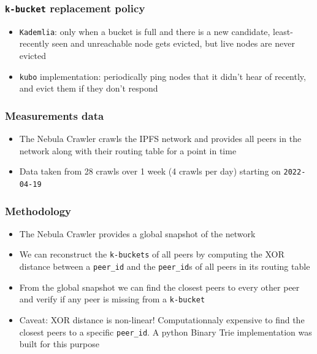 \documentclass{pl-slide}
\begin{document}
\begin{frame}
\frametitle{\texttt{k-bucket} replacement policy}
\begin{itemize}
    \item \texttt{Kademlia}: only when a bucket is full and there is a new candidate, least-recently seen and unreachable node gets evicted, but live nodes are never evicted
	\bigskip    
    \item \texttt{kubo} implementation: periodically ping nodes that it didn't hear of recently, and evict them if they don't respond
\end{itemize}
\end{frame}

\begin{frame}
\frametitle{Measurements data}
\begin{itemize}
    \item The Nebula Crawler crawls the IPFS network and provides all peers in the network along with their routing table for a point in time
    \item Data taken from 28 crawls over 1 week (4 crawls per day) starting on \texttt{2022-04-19}
\end{itemize}
\end{frame}

\begin{frame}
\frametitle{Methodology}
\begin{itemize}
	\item The Nebula Crawler provides a global snapshot of the network
	\item We can reconstruct the \texttt{k-buckets} of all peers by computing the XOR distance between a \texttt{peer\_id} and the \texttt{peer\_id}s of all peers in its routing table
	\item From the global snapshot we can find the closest peers to every other peer and verify if any peer is missing from a \texttt{k-bucket}
    \item Caveat: XOR distance is non-linear! Computationnaly expensive to find the closest peers to a specific \texttt{peer\_id}. A python Binary Trie implementation was built for this purpose
\end{itemize}
\end{frame}
\end{document}
